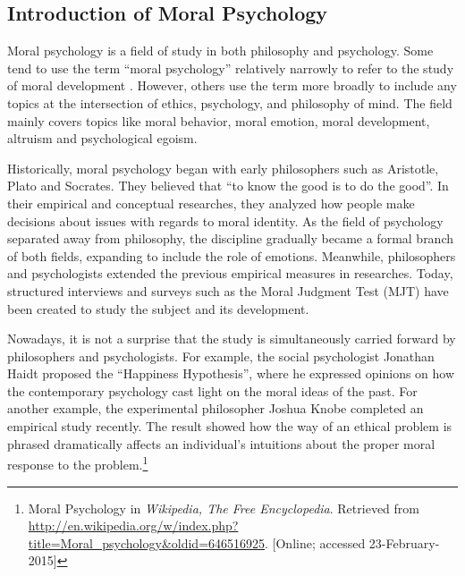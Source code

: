 \subsection{Introduction of Moral Psychology} %
\label{sub:introduction_of_moral_psychology}
\begin{text}

Moral psychology is a field of study in both philosophy and psychology. Some tend to use the term ``moral psychology'' relatively narrowly to refer to the study of moral development \citep{lapsley1996moral}. However, others use the term more broadly to include any topics at the intersection of ethics, psychology, and philosophy of mind. The field mainly covers topics like moral behavior, moral emotion, moral development, altruism and psychological egoism.

Historically, moral psychology began with early philosophers such as Aristotle, Plato and Socrates. They believed that ``to know the good is to do the good''. In their empirical and conceptual researches, they analyzed how people make decisions about issues with regards to moral identity. As the field of psychology separated away from philosophy, the discipline gradually became a formal branch of both fields, expanding to include the role of emotions. Meanwhile, philosophers and psychologists extended the previous empirical measures in researches. Today, structured interviews and surveys such as the Moral Judgment Test (MJT) have been created to study the subject and its development.

Nowadays, it is not a surprise that the study is simultaneously carried forward by philosophers and psychologists. For example, the social psychologist Jonathan Haidt proposed the ``Happiness Hypothesis'', where he expressed opinions on how the contemporary psychology cast light on the moral ideas of the past. For another example, the experimental philosopher Joshua Knobe completed an empirical study recently. The result showed how the way of an ethical problem is phrased dramatically affects an individual's intuitions about the proper moral response to the problem.\footnote{Moral Psychology in \textit{Wikipedia{,} The Free Encyclopedia}. Retrieved from \url{http://en.wikipedia.org/w/index.php?title=Moral_psychology&oldid=646516925}. [Online; accessed 23-February-2015]}

\end{text}
